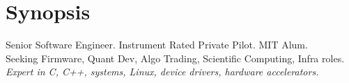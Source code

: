 \section{Synopsis}
Senior Software Engineer. Instrument Rated Private Pilot. MIT Alum.\\
Seeking Firmware, Quant Dev, Algo Trading, Scientific Computing, Infra roles. \\
\emph{Expert in C, C++, systems, Linux, device drivers, hardware accelerators.}
